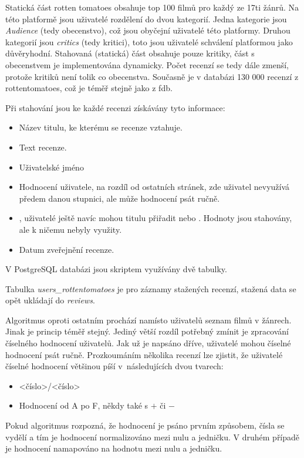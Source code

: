 Statická část rotten tomatoes obsahuje top 100 filmů pro každý ze 17ti žánrů. Na této platformě jsou uživatelé rozdělení do dvou kategorií. Jedna kategorie jsou \emph{Audience} (tedy obecenstvo), což jsou obyčejní uživatelé této platformy. Druhou kategorií jsou \emph{critics} (tedy kritici), toto jsou uživatelé schválení platformou jako důvěryhodní. Stahovaná (statická) část obsahuje pouze kritiky, část s obecenstvem je implementována dynamicky. Počet recenzí se tedy dále zmenší, protože kritiků není tolik co obecenstva. Současně je v databázi 130 000 recenzí z rottentomatoes, což je téměř stejně jako z fdb.

Při stahování jsou ke každé recenzi získávány tyto informace:
\begin{itemize}
    \item Název titulu, ke kterému se recenze vztahuje.
    \item Text recenze.
    \item Uživatelské jméno
    \item Hodnocení uživatele, na rozdíl od ostatních stránek, zde uživatel nevyužívá předem danou stupnici, ale může hodnocení psát ručně.
    \item {}, uživatelé ještě navíc mohou titulu přiřadit  nebo . Hodnoty jsou stahovány, ale k ničemu nebyly využity.
    \item Datum zveřejnění recenze.
\end{itemize}

V PostgreSQL databázi jsou skriptem využívány dvě tabulky. 

Tabulka \emph{users\_rottentomatoes} je pro záznamy stažených recenzí, stažená data se opět ukládají do \emph{reviews}. 

Algoritmus oproti ostatním prochází namísto uživatelů seznam filmů v žánrech. Jinak je princip téměř stejný.
Jediný větší rozdíl potřebný zmínit je zpracování číselného hodnocení uživatelů. Jak už je napsáno dříve, uživatelé mohou číselné hodnocení psát ručně. Prozkoumáním několika recenzí lze zjistit, že uživatelé číselné hodnocení většinou píší v~následujících dvou tvarech:
\begin{itemize}
    \item <číslo>/<číslo>
    \item Hodnocení od A po F, někdy také s $+$ či $-$
\end{itemize}

Pokud algoritmus rozpozná, že hodnocení je psáno prvním způsobem, čísla se vydělí a tím je hodnocení normalizováno mezi nulu a jedničku.
V druhém případě je hodnocení namapováno na hodnotu mezi nulu a jedničku.

